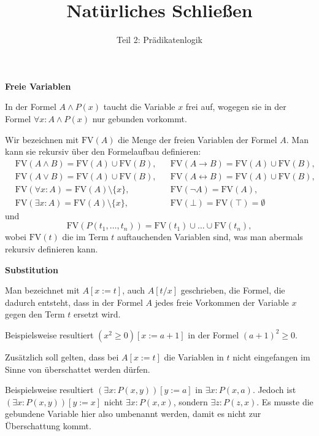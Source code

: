 \documentclass[8pt]{beamer}
\title{Natürliches Schließen}
\subtitle{Teil 2: Prädikatenlogik}
\date{}
\newcommand{\strong}[1]{\textsf{\textbf{#1}}}
\newcommand{\centerheadline}[1]{%
  \begin{center}\strong{#1}\end{center}}
\newcommand{\parspace}{\vspace{0.8em}}
\newcommand{\cond}{\rightarrow}
\newcommand{\FV}{\mathrm{FV}}
\begin{document}
\begin{frame}
\maketitle
\end{frame}

\begin{frame}
\centerheadline{Freie Variablen}
\end{frame}

\begin{frame}
In der Formel $A\land P(x)$ taucht die Variable $x$ frei auf,
wogegen sie in der Formel $\forall x\colon A\land P(x)$ nur gebunden
vorkommt.\pause

\parspace
Wir bezeichnen mit $\FV(A)$ die Menge der freien Variablen
der Formel $A$. Man kann sie rekursiv über den Formelaufbau definieren:
\begin{align*}
& \FV(A\land B) = \FV(A)\cup\FV(B), && \FV(A\cond B) = \FV(A)\cup\FV(B),\\
& \FV(A\lor B)  = \FV(A)\cup\FV(B), && \FV(A\leftrightarrow B) = \FV(A)\cup\FV(B),\\
& \FV(\forall x\colon A) = \FV(A)\setminus\{x\}, && \FV(\neg A) = \FV(A),\\
& \FV(\exists x\colon A) = \FV(A)\setminus\{x\}, && \FV(\bot) = \FV(\top) = \emptyset
\end{align*}
und
\[\FV(P(t_1,\ldots,t_n)) = \FV(t_1)\cup\ldots\cup\FV(t_n),\]
wobei $\FV(t)$ die im Term $t$ auftauchenden Variablen sind, was
man abermals rekursiv definieren kann.
\end{frame}

\begin{frame}
\centerheadline{Substitution}
\end{frame}

\begin{frame}
Man bezeichnet mit $A[x:=t]$, auch $A[t/x]$ geschrieben, die Formel,
die dadurch entsteht, dass in der Formel $A$ jedes freie Vorkommen
der Variable $x$ gegen den Term $t$ ersetzt wird.\pause

\parspace
Beispielsweise resultiert $(x^2\ge 0)[x:=a+1]$ in der Formel $(a+1)^2\ge 0$.\pause

\parspace
Zusätzlich soll gelten, dass bei $A[x:=t]$ die Variablen in $t$ nicht
eingefangen im Sinne von überschattet werden dürfen.\pause

\parspace
Beispielsweise resultiert $(\exists x\colon P(x,y))[y:=a]$ in
$\exists x\colon P(x,a)$. Jedoch ist $(\exists x\colon P(x,y))[y:=x]$
nicht $\exists x\colon P(x,x)$, sondern $\exists z\colon P(z,x)$.
Es musste die gebundene Variable hier also umbenannt werden, damit
es nicht zur Überschattung kommt.
\end{frame}
\end{document}
